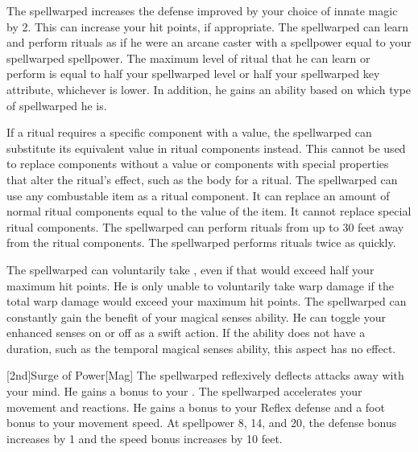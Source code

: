         The spellwarped increases the defense improved by your choice of innate magic by 2.
        This can increase your hit points, if appropriate.
         The spellwarped can learn and perform rituals as if he were an arcane caster with a spellpower equal to your spellwarped spellpower.  The maximum level of ritual that he can learn or perform is equal to half your spellwarped level or half your spellwarped key attribute, whichever is lower.
        In addition, he gains an ability based on which type of spellwarped he is.
        \begin{itemize}
             If a ritual requires a specific component with a value, the spellwarped can substitute its equivalent value in ritual components instead.
                This cannot be used to replace components without a value or components with special properties that alter the ritual's effect, such as the body for a  ritual.
                The spellwarped can use any combustable item as a ritual component.
                It can replace an amount of normal ritual components equal to the value of the item.
                It cannot replace special ritual components.
                The spellwarped can perform rituals from up to 30 feet away from the ritual components.
                The spellwarped performs rituals twice as quickly.
        \end{itemize}
        The spellwarped can voluntarily take , even if that would exceed half your maximum hit points.
        He is only unable to voluntarily take warp damage if the total warp damage would exceed your maximum hit points.
        The spellwarped can constantly gain the benefit of your magical senses ability.
        He can toggle your enhanced senses on or off as a swift action.
        If the ability does not have a duration, such as the temporal magical senses ability, this aspect has no effect.

        [2nd]{Surge of Power}[Mag]
        The spellwarped reflexively deflects attacks away with your mind.
        He gains a  bonus to your .
        The spellwarped accelerates your movement and reactions.
        He gains a  bonus to your Reflex defense and a  foot bonus to your movement speed.
        At spellpower 8, 14, and 20, the defense bonus increases by 1 and the speed bonus increases by 10 feet.

